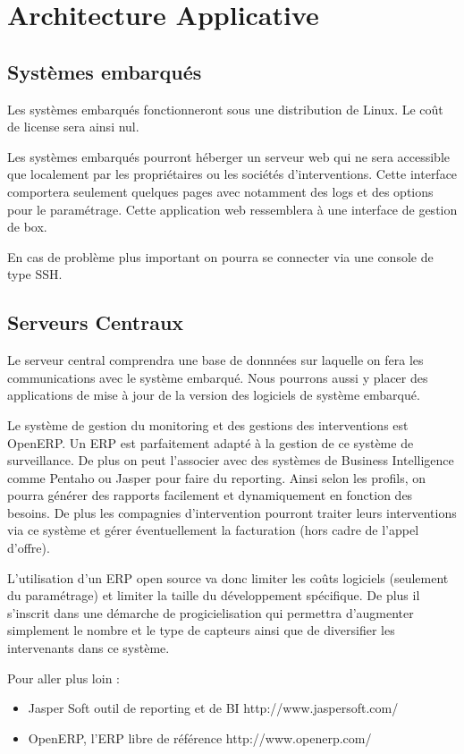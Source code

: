 \section{Architecture Applicative}

\subsection{Systèmes embarqués}

Les systèmes embarqués fonctionneront sous une distribution de Linux. Le
coût de license sera ainsi nul. 

Les systèmes embarqués pourront héberger un serveur web qui ne sera
accessible que localement par les propriétaires ou les sociétés
d'interventions. Cette interface comportera seulement quelques pages avec
notamment des logs et des options pour le paramétrage. Cette application
web ressemblera à une interface de gestion de box.

En cas de problème plus important on pourra se connecter via une console de
type SSH.

\subsection{Serveurs Centraux}

Le serveur central comprendra une base de donnnées sur laquelle on fera les
communications avec le système embarqué. Nous pourrons aussi y placer des
applications de mise à jour de la version des logiciels de système
embarqué. 

Le système de gestion du monitoring et des gestions des interventions est
OpenERP. Un ERP est parfaitement adapté à la gestion de ce système de
surveillance. De plus on peut l'associer avec des systèmes de Business
Intelligence comme Pentaho ou Jasper pour faire du reporting. Ainsi selon
les profils, on pourra générer des rapports facilement et dynamiquement en
fonction des besoins.  De plus les compagnies d'intervention pourront
traiter leurs interventions via ce système et gérer éventuellement la
facturation (hors cadre de l'appel d'offre).

L'utilisation d'un ERP open source va donc limiter les coûts logiciels
(seulement du paramétrage) et limiter la taille du développement
spécifique. De plus il s'inscrit dans une démarche de progicielisation qui
permettra d'augmenter simplement le nombre et le type de capteurs ainsi que
de diversifier les intervenants dans ce système.

Pour aller plus loin : 
\begin{itemize}
\item Jasper Soft outil de reporting et de BI http://www.jaspersoft.com/
\item OpenERP, l'ERP libre de référence http://www.openerp.com/
\end{itemize}


